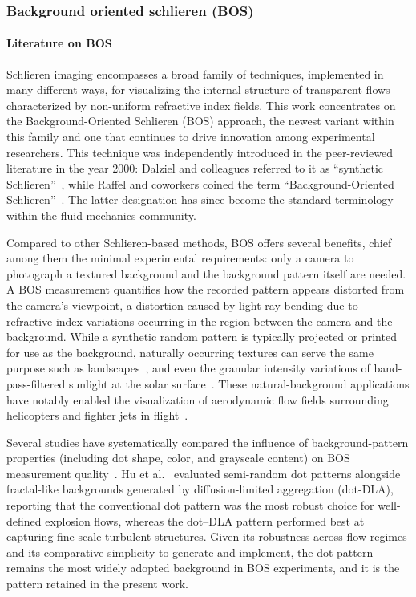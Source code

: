 \documentclass[../../../main.tex]{subfiles}
\begin{document}
\subsubsection{Background oriented schlieren (BOS)}

\paragraph{Literature on BOS}

Schlieren imaging encompasses a broad family of techniques, implemented in many different ways, for visualizing the internal structure of transparent flows characterized by non-uniform refractive index fields. This work concentrates on the Background-Oriented Schlieren (BOS) approach, the newest variant within this family and one that continues to drive innovation among experimental researchers. This technique was independently introduced in the peer-reviewed literature in the year 2000: Dalziel and colleagues referred to it as ``synthetic Schlieren''~\cite{Dalziel2000WholefieldDensity}, while Raffel and coworkers coined the term ``Background-Oriented Schlieren''~\cite{Raffel2000ApplicabilityBackground}. The latter designation has since become the standard terminology within the fluid mechanics community.

Compared to other Schlieren-based methods, BOS offers several benefits, chief among them the minimal experimental requirements: only a camera to photograph a textured background and the background pattern itself are needed. A BOS measurement quantifies how the recorded pattern appears distorted from the camera's viewpoint, a distortion caused by light-ray bending due to refractive-index variations occurring in the region between the camera and the background. While a synthetic random pattern is typically projected or printed for use as the background, naturally occurring textures can serve the same purpose such as landscapes~\cite{Hargather2010NaturalbackgroundorientedSchlieren}, and even the granular intensity variations of band-pass-filtered sunlight at the solar surface~\cite{Jr2017BackgroundOriented}. These natural-background applications have notably enabled the visualization of aerodynamic flow fields surrounding helicopters and fighter jets in flight~\cite{AirborneApplication, Heineck2016BackgroundOriented, Schmidt2025TwentyFiveYears}.

Several studies have systematically compared the influence of background-pattern properties (including dot shape, color, and grayscale content) on BOS measurement quality~\cite{Hu2025PerformanceBackgroundoriented, Leopold2012INCREASEACCURAY}. Hu et al.~\cite{Hu2025PerformanceBackgroundoriented} evaluated semi-random dot patterns alongside fractal-like backgrounds generated by diffusion-limited aggregation (dot-DLA), reporting that the conventional dot pattern was the most robust choice for well-defined explosion flows, whereas the dot–DLA pattern performed best at capturing fine-scale turbulent structures. Given its robustness across flow regimes and its comparative simplicity to generate and implement, the dot pattern remains the most widely adopted background in BOS experiments, and it is the pattern retained in the present work.
\end{document}
